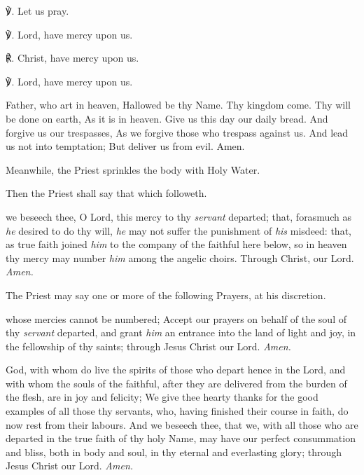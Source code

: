 ℣. Let us pray.

℣. Lord, have mercy upon us.

℟. Christ, have mercy upon us.

℣. Lord, have mercy upon us.

 Father, who art in heaven, Hallowed be thy Name. Thy kingdom come. Thy will be done on earth, As it is in heaven. Give us this day our daily bread. And forgive us our trespasses, As we forgive those who trespass against us. And lead us not into temptation; But deliver us from evil. Amen.

\begin{rubric}
    Meanwhile, the Priest sprinkles the body with Holy Water.
\end{rubric}
\begin{rubric}
	Then the Priest shall say that which followeth.
\end{rubric}
 we beseech thee, O Lord, this mercy to thy \textit{servant} departed; that, forasmuch as \textit{he} desired to do thy will, \textit{he} may not suffer the punishment of \textit{his} misdeed: that, as true faith joined \textit{him} to the company of the faithful here below, so in heaven thy mercy may number \textit{him} among the angelic choirs. Through Christ, our Lord. \textit{Amen.}
\begin{rubric}
    The Priest may say one or more of the following Prayers, at his discretion.
\end{rubric}\par

 whose mercies cannot be numbered; Accept our prayers on behalf of the soul of thy \textit{servant} departed, and grant \textit{him} an entrance into the land of light and joy, in the fellowship of thy saints; through Jesus Christ our Lord. \textit{Amen.}\par

 God, with whom do live the spirits of those who depart hence in the Lord, and with whom the souls of the faithful, after they are delivered from the burden of the flesh, are in joy and felicity; We give thee hearty thanks for the good examples of all those thy servants, who, having finished their course in faith, do now rest from their labours. And we beseech thee, that we, with all those who are departed in the true faith of thy holy Name, may have our perfect consummation and bliss, both in body and soul, in thy eternal and everlasting glory; through Jesus Christ our Lord. \textit{Amen.}\par

